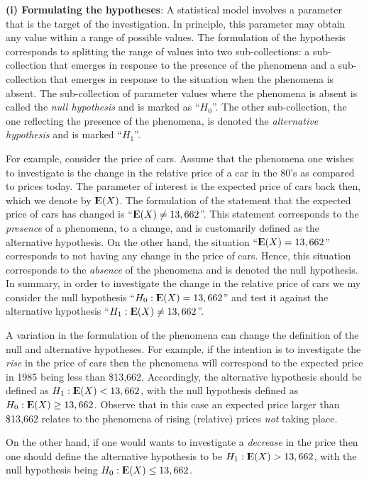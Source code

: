 \documentclass[]{krantz}
\newcommand{\Expec}{{\rm I\kern-.3em E}}
\theoremstyle{definition}
\theoremstyle{definition}
\theoremstyle{definition}
\theoremstyle{remark}
\begin{document}
{\textbf{(i) Formulating the hypotheses}}: A statistical model involves
a parameter that is the target of the investigation. In principle, this
parameter may obtain any value within a range of possible values. The
formulation of the hypothesis corresponds to splitting the range of
values into two sub-collections: a sub-collection that emerges in
response to the presence of the phenomena and a sub-collection that
emerges in response to the situation when the phenomena is absent. The
sub-collection of parameter values where the phenomena is absent is
called the \emph{null hypothesis} and is marked as ``\(H_0\)''. The
other sub-collection, the one reflecting the presence of the phenomena,
is denoted the \emph{alternative hypothesis} and is marked ``\(H_1\)''.

For example, consider the price of cars. Assume that the phenomena one
wishes to investigate is the change in the relative price of a car in
the 80's as compared to prices today. The parameter of interest is the
expected price of cars back then, which we denote by \(\Expec(X)\). The
formulation of the statement that the expected price of cars has changed
is ``\(\Expec(X) \not = 13,662\)''. This statement corresponds to the
\emph{presence} of a phenomena, to a change, and is customarily defined
as the alternative hypothesis. On the other hand, the situation
``\(\Expec(X) = 13,662\)'' corresponds to not having any change in the
price of cars. Hence, this situation corresponds to the \emph{absence}
of the phenomena and is denoted the null hypothesis. In summary, in
order to investigate the change in the relative price of cars we my
consider the null hypothesis ``\(H_0:\Expec(X) = 13,662\)'' and test it
against the alternative hypothesis ``\(H_1: \Expec(X)\not = 13,662\)''.

A variation in the formulation of the phenomena can change the
definition of the null and alternative hypotheses. For example, if the
intention is to investigate the \emph{rise} in the price of cars then
the phenomena will correspond to the expected price in 1985 being less
than \$13,662. Accordingly, the alternative hypothesis should be defined
as \(H_1: \Expec(X) < 13,662\), with the null hypothesis defined as
\(H_0: \Expec(X) \geq 13,662\). Observe that in this case an expected
price larger than \$13,662 relates to the phenomena of rising (relative)
prices \emph{not} taking place.

On the other hand, if one would wants to investigate a \emph{decrease}
in the price then one should define the alternative hypothesis to be
\(H_1: \Expec(X) > 13,662\), with the null hypothesis being
\(H_0: \Expec(X) \leq 13,662\).
\end{document}
